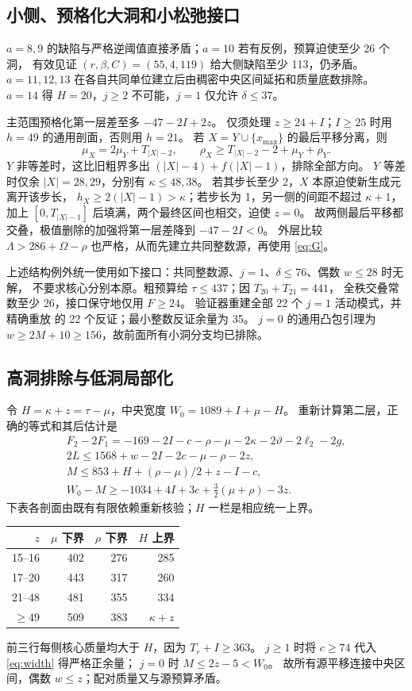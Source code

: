 \documentclass[11pt,a4paper]{article}
\begin{document}
\subsection{小侧、预格化大洞和小松弛接口}
$a=8,9$ 的缺陷与严格逆阈值直接矛盾；$a=10$ 若有反例，预算迫使至少 26 个洞，
有效见证 $(r,\beta,C)=(55,4,119)$ 给大侧缺陷至少 113，仍矛盾。
$a=11,12,13$ 在各自共同单位建立后由稠密中央区间延拓和质量底数排除。
$a=14$ 得 $H=20$，$j\ge2$ 不可能，$j=1$ 仅允许 $\delta\le37$。

主范围预格化第一层差至多 $-47-2I+2z$。
仅须处理 $z\ge24+I$；$I\ge25$ 时用 $h=49$ 的通用剖面，否则用 $h=21$。
若 $X=Y\cup\{x_{\max}\}$ 的最后平移分离，则
\[
 \mu_X=2\mu_Y+T_{|X|-2},\qquad
 \rho_X\ge T_{|X|-2}-2+\mu_Y+\rho_Y.
\]
$Y$ 非等差时，这比旧粗界多出 $(|X|-4)+f(|X|-1)$，排除全部方向。
$Y$ 等差时仅余 $|X|=28,29$，分别有 $\kappa\le48,38$。
若其步长至少 2，$X$ 本原迫使新生成元离开该步长，
$h_X\ge2(|X|-1)>\kappa$；若步长为 1，另一侧的间距不超过 $\kappa+1$，
加上 $[0,T_{|X|-1}]$ 后填满，两个最终区间也相交，迫使 $z=0$。
故两侧最后平移都交叠，极值删除的加强将第一层差降到 $-47-2I<0$。
外层比较 $\Lambda>286+\Omega-\rho$ 也严格，从而先建立共同整数源，再使用 \eqref{eq:G}。

上述结构例外统一使用如下接口：共同整数源、$j=1$、$\delta\le76$、偶数 $w\le28$ 时无解，
不要求核心分别本原。粗预算给 $\tau\le437$；因 $T_{20}+T_{21}=441$，
全秩交叠常数至少 26，接口保守地仅用 $F\ge24$。
验证器重建全部 22 个 $j=1$ 活动模式，并精确重放
 的 22 个反证；最小整数反证余量为 35。
$j=0$ 的通用凸包引理为 $w\ge2M+10\ge156$，故前面所有小洞分支均已排除。

\subsection{高洞排除与低洞局部化}
令 $H=\kappa+z=\tau-\mu$，中央宽度 $W_0=1089+I+\mu-H$。
重新计算第二层，正确的等式和其后估计是
\begin{gather}
 F_2-2F_1=-169-2I-c-\rho-\mu-2\kappa-2\vartheta-2\ell_2-2g,\label{eq:layer}\\
 2L\le1568+w-2I-2c-\mu-\rho-2z,\nonumber\\
 M\le853+H+(\rho-\mu)/2+z-I-c,\nonumber\\
 W_0-M\ge-1034+4I+3c+\tfrac32(\mu+\rho)-3z.\label{eq:width}
\end{gather}
下表各剖面由既有有限依赖重新核验；$H$ 一栏是相应统一上界。
\begin{center}\begin{tabular}{rrrr}\toprule
$z$ & $\mu$ 下界 & $\rho$ 下界 & $H$ 上界\\\midrule
15--16&402&276&285\\17--20&443&317&260\\21--48&481&355&334\\
$\ge49$&509&383&$\kappa+z$\\\bottomrule\end{tabular}\end{center}
前三行每侧核心质量均大于 $H$，因为 $T_r+I\ge363$。
$j\ge1$ 时将 $c\ge74$ 代入 \eqref{eq:width} 得严格正余量；
$j=0$ 时 $M\le2z-5<W_0$。
故所有源平移连接中央区间，偶数 $w\le z$；配对质量又与源预算矛盾。
\end{document}
